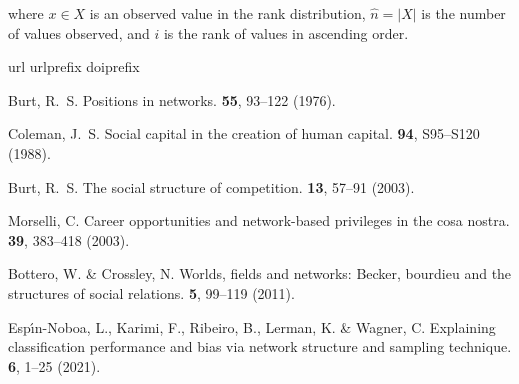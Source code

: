 \documentclass[fleqn,10pt]{wlscirep}
\begin{document}
where $x \in X$ is an observed value in the rank distribution, $\hat{n}=|X|$ is the number of values observed, and $i$ is the rank of values in ascending order.






\begin{thebibliography}{10}
\expandafter\ifx\csname url\endcsname\relax
  \def\url#1{\texttt{#1}}\fi
\expandafter\ifx\csname urlprefix\endcsname\relax\def\urlprefix{URL }\fi
\expandafter\ifx\csname doiprefix\endcsname\relax\def\doiprefix{DOI: }\fi
\providecommand{\bibinfo}[2]{#2}
\providecommand{\eprint}[2][]{\url{#2}}

\bibinfo{author}{Burt, R.~S.}
\newblock \bibinfo{journal}{\bibinfo{title}{Positions in networks}}.
 \textbf{\bibinfo{volume}{55}},
  \bibinfo{pages}{93--122} (\bibinfo{year}{1976}).

\bibinfo{author}{Coleman, J.~S.}
\newblock \bibinfo{journal}{\bibinfo{title}{Social capital in the creation of
  human capital}}.
  \textbf{\bibinfo{volume}{94}}, \bibinfo{pages}{S95--S120}
  (\bibinfo{year}{1988}).

\bibinfo{author}{Burt, R.~S.}
\newblock \bibinfo{journal}{\bibinfo{title}{The social structure of
  competition}}.
  \textbf{\bibinfo{volume}{13}}, \bibinfo{pages}{57--91}
  (\bibinfo{year}{2003}).

\bibinfo{author}{Morselli, C.}
\newblock \bibinfo{journal}{\bibinfo{title}{Career opportunities and
  network-based privileges in the cosa nostra}}.
  \textbf{\bibinfo{volume}{39}}, \bibinfo{pages}{383--418}
  (\bibinfo{year}{2003}).

\bibinfo{author}{Bottero, W.} \& \bibinfo{author}{Crossley, N.}
\newblock \bibinfo{journal}{\bibinfo{title}{Worlds, fields and networks:
  Becker, bourdieu and the structures of social relations}}.
  \textbf{\bibinfo{volume}{5}}, \bibinfo{pages}{99--119}
  (\bibinfo{year}{2011}).

\bibinfo{author}{Esp{\'\i}n-Noboa, L.}, \bibinfo{author}{Karimi, F.},
  \bibinfo{author}{Ribeiro, B.}, \bibinfo{author}{Lerman, K.} \&
  \bibinfo{author}{Wagner, C.}
\newblock \bibinfo{journal}{\bibinfo{title}{Explaining classification
  performance and bias via network structure and sampling technique}}.
  \textbf{\bibinfo{volume}{6}}, \bibinfo{pages}{1--25} (\bibinfo{year}{2021}).


\end{thebibliography}
\end{document}
